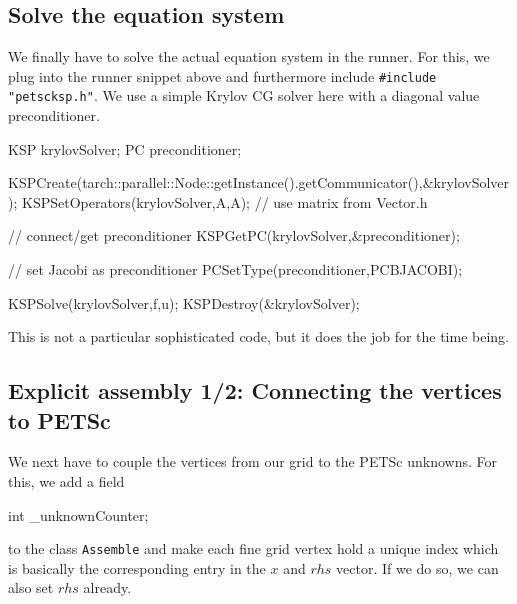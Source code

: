 \subsection{Solve the equation system}


We finally have to solve the actual equation system in the runner. For this, we
plug into the runner snippet above and furthermore include
\texttt{\#include "petscksp.h"}. We use a simple Krylov CG solver here with a
diagonal value preconditioner.

\begin{code}
KSP krylovSolver;
PC  preconditioner;

KSPCreate(tarch::parallel::Node::getInstance().getCommunicator(),&krylovSolver);
KSPSetOperators(krylovSolver,A,A); // use matrix from Vector.h

// connect/get preconditioner
KSPGetPC(krylovSolver,&preconditioner);

// set Jacobi as preconditioner
PCSetType(preconditioner,PCBJACOBI);

KSPSolve(krylovSolver,f,u);
KSPDestroy(&krylovSolver);
\end{code}

\noindent
This is not a particular sophisticated code, but it does the job for the time
being.


\subsection{Explicit assembly 1/2: Connecting the vertices to PETSc}


We next have to couple the vertices from our grid to the PETSc unknowns. 
For this, we add a field     

\begin{code}
int  _unknownCounter;
\end{code}

\noindent
to the class \texttt{Assemble} and make each fine grid vertex hold a unique
index which is basically the corresponding entry in the $x$ and $rhs$ vector.
If we do so, we can also set $rhs$ already.

